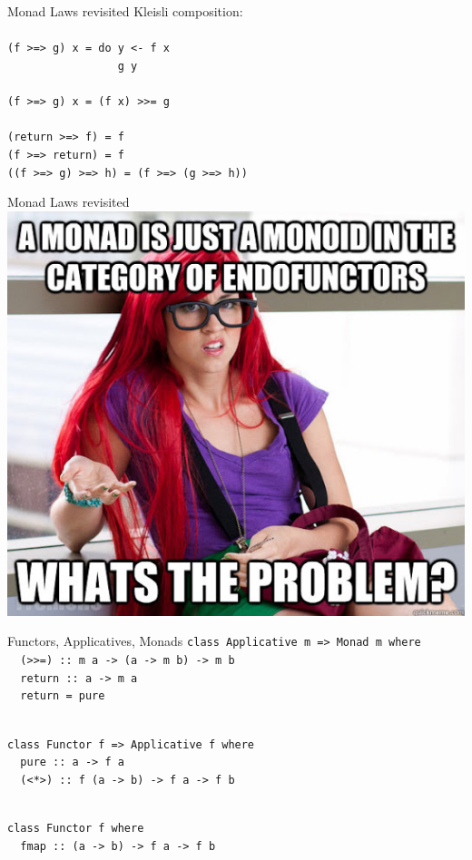 \documentclass{beamer}
\begin{document}
\begin{frame}{Monad Laws revisited}
  Kleisli composition: \\ \pause
  \ \\
  \texttt{(f >=> g) x = do y <- f x \\
    \ \ \ \ \ \ \ \ \ \ \ \ \ \ \ \ \ g y} \\ \pause
  \ \\ 
  \texttt{(f >=> g) x = (f x) >>= g} \\ \pause
  \ \\
  \texttt{(return >=> f) = f} \\ \pause
  \texttt{(f >=> return) = f} \\ \pause
  \texttt{((f >=> g) >=> h) = (f >=> (g >=> h))}
\end{frame}

\begin{frame}{Monad Laws revisited}
  \includegraphics[width=\textwidth]{monoids.jpg}  
\end{frame}

\begin{frame}{Functors, Applicatives, Monads}\pause
  \texttt{class Applicative m => Monad m where\\
    \ \ (>>=) :: m a -> (a -> m b) -> m b\\
    \ \ return :: a -> m a\\
    \ \ return = pure}\\
  \ \\ \pause

  \texttt{class Functor f => Applicative f where\\
    \ \ pure  :: a -> f a\\
    \ \ (<*>) :: f (a -> b) -> f a -> f b}\\
  \ \\ \pause

  \texttt{class Functor f where\\
    \ \ fmap :: (a -> b) -> f a -> f b}
\end{frame}
\end{document}
